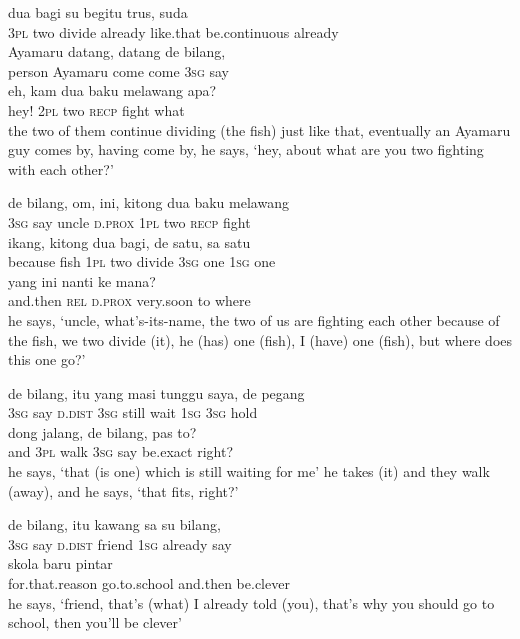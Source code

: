 \ea
{}    {dua}    {bagi}    {su}    {begitu}    {trus,}   suda\\
   {\textsc{3pl}}    {two}    {divide}    {already}    {like.that}    {be.continuous}   already\\
    {Ayamaru}    {datang,}    {datang}    {de}    {bilang,}\\
   {person}    {Ayamaru}    {come}    {come}    {\textsc{3sg}}    {say}\\
\gll eh,    {kam}   dua    {baku}    {melawang}    {apa?}\\
  hey!    {\textsc{2pl}}   two    {\textsc{recp}}    {fight}    {what}\\
\glt
the two of them continue dividing (the fish) just like that, eventually an Ayamaru guy comes by, having come by, he says, ‘hey, about what are you two fighting with each other?’
\z

\ea
\gll   de    {bilang,}    {om,}    {ini,}    {kitong}    {dua}    {baku}    {melawang}\\
  \textsc{3sg}    {say}    {uncle}    {\textsc{d.prox}}    {\textsc{1pl}}    {two}    {\textsc{recp}}    {fight}\\
    {ikang,}    {kitong}    {dua}    {bagi,}    {de}    {satu,}   sa   satu\\
   {because}    {fish}    {\textsc{1pl}}    {two}    {divide}    {\textsc{3sg}}    {one}   \textsc{1sg}   one\\
    {yang}    {ini}    {nanti}    {ke}    {mana?}\\
   {and.then}    {\textsc{rel}}    {\textsc{d.prox}}    {very.soon}    {to}    {where}\\
\glt
he says, ‘uncle, what’s-its-name, the two of us are fighting each other because of the fish, we two divide (it), he (has) one (fish), I (have) one (fish), but where does this one go?’
\z

\ea
\gll   de    {bilang,}    {itu}    {yang}   masi    {tunggu}   saya,   de   pegang\\
  \textsc{3sg}    {say}    {\textsc{d.dist}}    {\textsc{3sg}}   still    {wait}   \textsc{1sg}   \textsc{3sg}   hold\\
   dong    {jalang,}    {de}    {bilang,}   pas    {to?}\\
   {and}   \textsc{3pl}    {walk}    {\textsc{3sg}}    {say}   be.exact    {right?}\\
\glt
he says, ‘that (is one) which is still waiting for me’ he takes (it) and they walk (away), and he says, ‘that fits, right?’
\z

\ea
\gll   de   bilang,    {itu}    {kawang}   sa    {su}   bilang,\\
  \textsc{3sg}   say    {\textsc{d.dist}}    {friend}   \textsc{1sg}    {already}   say\\
    {skola}    {baru}    {pintar}\\
   {for.that.reason}    {go.to.school}    {and.then}    {be.clever}\\
\glt
he says, ‘friend, that’s (what) I already told (you), that’s why you should go to school, then you’ll be clever’
\z %

